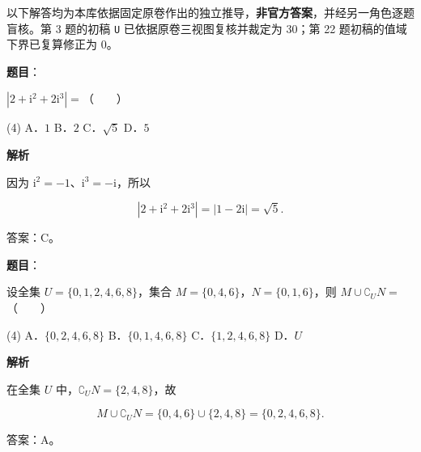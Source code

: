 

\begin{gktip}
以下解答均为本库依据固定原卷作出的独立推导，\textbf{非官方答案}，并经另一角色逐题盲核。第 3 题的初稿 \texttt{U} 已依据原卷三视图复核并裁定为 30；第 22 题初稿的值域下界已复算修正为 0。
\end{gktip}


\begin{answer}

\textbf{题目}：

$|2+\mathrm i^2+2\mathrm i^3|=$\mbox{（　　）}

\begin{gkopts}(4)
\task A．$1$
\task B．$2$
\task C．$\sqrt5$
\task D．$5$
\end{gkopts}

\textbf{解析}

因为 $\mathrm i^2=-1$、$\mathrm i^3=-\mathrm i$，所以

\nopagebreak[4]
\[
|2+\mathrm i^2+2\mathrm i^3|=|1-2\mathrm i|=\sqrt5.
\]

答案：C。


\end{answer}
\begin{answer}

\textbf{题目}：

设全集 $U=\{0,1,2,4,6,8\}$，集合 $M=\{0,4,6\}$，$N=\{0,1,6\}$，则 $M\cup\complement_U N=$\mbox{（　　）}

\begin{gkopts}(4)
\task A．$\{0,2,4,6,8\}$
\task B．$\{0,1,4,6,8\}$
\task C．$\{1,2,4,6,8\}$
\task D．$U$
\end{gkopts}

\textbf{解析}

在全集 $U$ 中，$\complement_U N=\{2,4,8\}$，故

\nopagebreak[4]
\[
M\cup\complement_U N=\{0,4,6\}\cup\{2,4,8\}=\{0,2,4,6,8\}.
\]

答案：A。


\end{answer}
